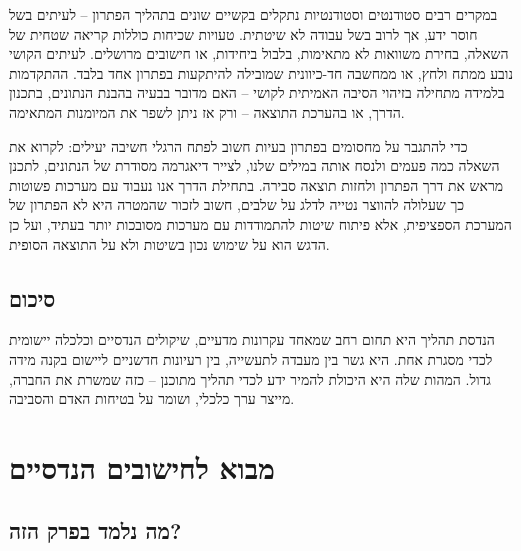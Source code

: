 \documentclass[
  hebrew,
  letterpaper,
  DIV=11,
  numbers=noendperiod]{scrreprt}
\begin{document}
{במקרים רבים סטודנטים וסטודנטיות נתקלים בקשיים שונים בתהליך הפתרון --
לעיתים בשל חוסר ידע, אך לרוב בשל עבודה לא שיטתית. טעויות שכיחות כוללות
קריאה שטחית של השאלה, בחירת משוואות לא מתאימות, בלבול ביחידות, או
חישובים מרושלים. לעיתים הקושי נובע ממתח ולחץ, או ממחשבה חד-כיוונית
שמובילה להיתקעות בפתרון אחד בלבד. ההתקדמות בלמידה מתחילה בזיהוי הסיבה
האמיתית לקושי -- האם מדובר בבעיה בהבנת הנתונים, בתכנון הדרך, או בהערכת
התוצאה -- ורק אז ניתן לשפר את המיומנות המתאימה.}

{כדי להתגבר על מחסומים בפתרון בעיות חשוב לפתח הרגלי חשיבה יעילים: לקרוא
את השאלה כמה פעמים ולנסח אותה במילים שלנו, לצייר דיאגרמה מסודרת של
הנתונים, לתכנן מראש את דרך הפתרון ולחזות תוצאה סבירה. בתחילת הדרך אנו
נעבוד עם מערכות פשוטות כך שעלולה להווצר נטייה לדלג על שלבים, חשוב לזכור
שהמטרה היא לא הפתרון של המערכת הספציפית, אלא פיתוח שיטות להתמודדות עם
מערכות מסובכות יותר בעתיד, ועל כן הדגש הוא על שימוש נכון בשיטות ולא על
התוצאה הסופית.}

\section{\texorpdfstring{{סיכום}}{סיכום}}\label{ux5e1ux5d9ux5dbux5d5ux5dd}

{הנדסת תהליך היא תחום רחב שמאחד עקרונות מדעיים, שיקולים הנדסיים וכלכלה
יישומית לכדי מסגרת אחת. היא גשר בין מעבדה לתעשייה, בין רעיונות חדשניים
ליישום בקנה מידה גדול. המהות שלה היא היכולת להמיר ידע לכדי תהליך מתוכנן
-- כזה שמשרת את החברה, מייצר ערך כלכלי, ושומר על בטיחות האדם והסביבה}.

{\hfill\break
}


\chapter{\texorpdfstring{{מבוא לחישובים
הנדסיים}}{מבוא לחישובים הנדסיים}}\label{ux5deux5d1ux5d5ux5d0-ux5dcux5d7ux5d9ux5e9ux5d5ux5d1ux5d9ux5dd-ux5d4ux5e0ux5d3ux5e1ux5d9ux5d9ux5dd}

\section{\texorpdfstring{{מה נלמד בפרק
הזה}?}{מה נלמד בפרק הזה?}}\label{ux5deux5d4-ux5e0ux5dcux5deux5d3-ux5d1ux5e4ux5e8ux5e7-ux5d4ux5d6ux5d4}
\end{document}

